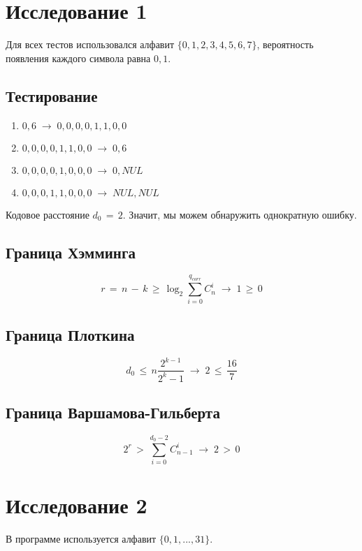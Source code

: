 \documentclass[oneside, final, 12pt]{extarticle}
\begin{document}
\lstset{caption=Реализация пользовательского интерфейса задания 2}


\lstset{caption=Реализация необходимых вычислений задания 2}


\section{Исследование 1}
Для всех тестов использовался алфавит \(\{0,1,2,3,4,5,6,7\}\), вероятность появления каждого символа равна \(0,1\).

\subsection*{Тестирование}
\begin{enumerate}
	\item \(0,6\;\rightarrow\;0,0,0,0,1,1,0,0\)
	\item \(0,0,0,0,1,1,0,0\;\rightarrow\;0,6\)
	\item \(0,0,0,0,1,0,0,0\;\rightarrow\;0,NUL\)
	\item \(0,0,0,1,1,0,0,0\;\rightarrow\;NUL,NUL\)
\end{enumerate}

Кодовое расстояние \(d_0\,=\,2\). Значит, мы можем обнаружить однократную ошибку.

\subsection*{Граница Хэмминга}
\[r\,=\,n\,-\,k\,\geqslant\,\log_2\sum_{i=0}^{q_{corr}} C_n^i\;\rightarrow\;1\,\geqslant\,0\]

\subsection*{Граница Плоткина}
\[d_0\,\leqslant\,n\frac{2^{k-1}}{2^k-1}\;\rightarrow\;2\,\leqslant\,\frac{16}{7}\]

\subsection*{Граница Варшамова-Гильберта}
\[2^r\,>\,\sum_{i=0}^{d_0-2}C_{n-1}^i\;\rightarrow\;2\,>\,0\]

\section{Исследование 2}
В программе используется алфавит \(\{0,1,...,31\}\).
\end{document}
